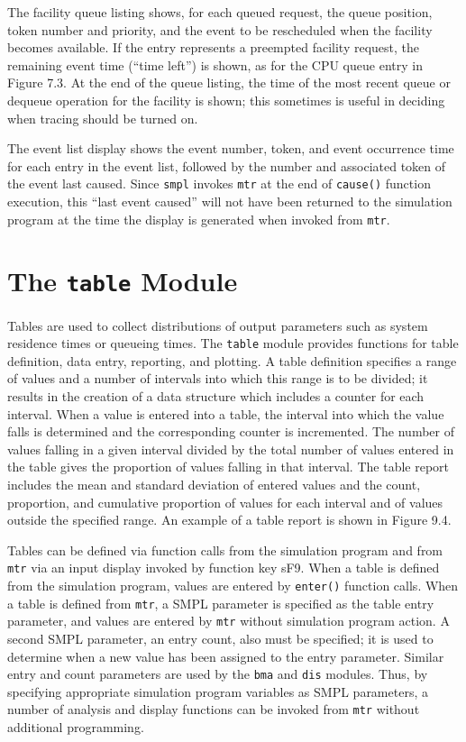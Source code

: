 The facility queue listing shows, for each queued request, the queue
position, token number and priority, and the event to be rescheduled when
the facility becomes available. If the entry represents a preempted facility
request, the remaining event time (``time left'') is shown, as for the CPU
queue entry in Figure 7.3. At the end of the queue listing, the time of the most
recent queue or dequeue operation for the facility is shown; this sometimes is
useful in deciding when tracing should be turned on.

The event list display shows the event number, token, and event
occurrence time for each entry in the event list, followed by the number and
associated token of the event last caused. Since \texttt{smpl} invokes \texttt{mtr} at the end
of \texttt{cause()} function execution, this ``last event caused'' will not have been
returned to the simulation program at the time the display is generated
when invoked from \texttt{mtr}.

\section{The \texttt{table} Module}
\label{sec:simenv-table}

Tables are used to collect distributions of output parameters such as system
residence times or queueing times. The \texttt{table} module provides functions
for table definition, data entry, reporting, and plotting. A table definition
specifies a range of values and a number of intervals into which this range is
to be divided; it results in the creation of a data structure which includes a
counter for each interval. When a value is entered into a table, the interval
into which the value falls is determined and the corresponding counter is
incremented. The number of values falling in a given interval divided by the
total number of values entered in the table gives the proportion of values
falling in that interval. The table report includes the mean and standard
deviation of entered values and the count, proportion, and cumulative
proportion of values for each interval and of values outside the specified
range. An example of a table report is shown in Figure 9.4.

Tables can be defined via function calls from the simulation program and
from \texttt{mtr} via an input display invoked by function key sF9. When a table is
defined from the simulation program, values are entered by \texttt{enter()}
function calls. When a table is defined from \texttt{mtr}, a SMPL parameter is
specified as the table entry parameter, and values are entered by \texttt{mtr}
without simulation program action. A second SMPL parameter, an entry
count, also must be specified; it is used to determine when a new value has
been assigned to the entry parameter. Similar entry and count parameters
are used by the \texttt{bma} and \texttt{dis} modules. Thus, by specifying appropriate
simulation program variables as SMPL parameters, a number of analysis and
display functions can be invoked from \texttt{mtr} without additional programming.


